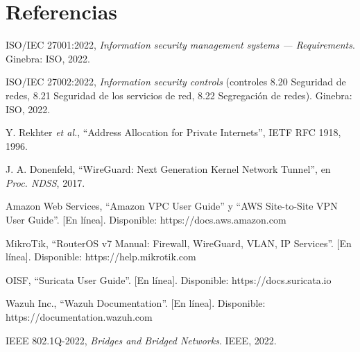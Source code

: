 \section*{Referencias}
{\small
\begin{enumerate}[label={[\arabic*]},leftmargin=2em]
  \item ISO/IEC 27001:2022, \emph{Information security management systems --- Requirements}. Ginebra: ISO, 2022.
  \item ISO/IEC 27002:2022, \emph{Information security controls} (controles 8.20 Seguridad de redes, 8.21 Seguridad de los servicios de red, 8.22 Segregación de redes). Ginebra: ISO, 2022.
  \item Y. Rekhter \emph{et al.}, ``Address Allocation for Private Internets'', IETF RFC 1918, 1996.
  \item J. A. Donenfeld, ``WireGuard: Next Generation Kernel Network Tunnel'', en \emph{Proc. NDSS}, 2017.
  \item Amazon Web Services, ``Amazon VPC User Guide'' y ``AWS Site-to-Site VPN User Guide''. [En línea]. Disponible: https://docs.aws.amazon.com
  \item MikroTik, ``RouterOS v7 Manual: Firewall, WireGuard, VLAN, IP Services''. [En línea]. Disponible: https://help.mikrotik.com
  \item OISF, ``Suricata User Guide''. [En línea]. Disponible: https://docs.suricata.io
  \item Wazuh Inc., ``Wazuh Documentation''. [En línea]. Disponible: https://documentation.wazuh.com
  \item IEEE 802.1Q-2022, \emph{Bridges and Bridged Networks}. IEEE, 2022.
\end{enumerate}
}

